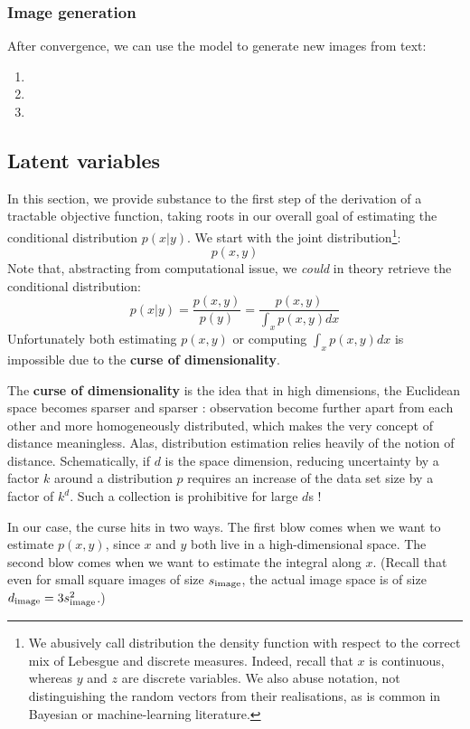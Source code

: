 \documentclass{article}
\begin{document}
\begin{appendix}
\subsubsection{Image generation}

After convergence, we can use the model to generate new images from text:

\begin{enumerate}
    \item
    \item
    \item
\end{enumerate}

\subsection{Latent variables}

In this section, we provide substance to the first step of the derivation of a tractable objective function, taking roots in our overall goal of estimating the conditional distribution $p(x|y)$. We start with the joint distribution\footnote{We abusively call distribution the density function with respect to the correct mix of Lebesgue and discrete measures. Indeed, recall that $x$ is continuous, whereas $y$ and $z$ are discrete variables. We also abuse notation, not distinguishing the random vectors from their realisations, as is common in Bayesian or machine-learning literature.}: $$p(x,y)$$
Note that, abstracting from computational issue, we \textit{could} in theory retrieve the conditional distribution: $$p(x|y)=\frac{p(x,y)}{p(y)}=\frac{p(x,y)}{\int_x p(x,y)dx} $$
Unfortunately both estimating $p(x,y)$ or computing $\int_x p(x,y)dx$ is impossible due to the \textbf{curse of dimensionality}.

The \textbf{curse of dimensionality} is the idea that in high dimensions, the Euclidean space becomes sparser and sparser : observation become further apart from each other and more homogeneously distributed, which makes the very concept of distance meaningless. Alas, distribution estimation relies heavily of the notion of distance. Schematically, if $d$ is the space dimension, reducing uncertainty by a factor $k$ around a distribution $p$ requires an increase of the data set size by a factor of $k^d$. Such a collection is prohibitive for large $d$s !

In our case, the curse hits in two ways. The first blow comes when we want to estimate $p(x,y)$, since $x$ and $y$ both live in a high-dimensional space. The second blow comes when we want to estimate the integral along $x$. (Recall that even for small square images of size $s_{\mathrm{image}}$, the actual image space is of size $d_{\mathrm{image}}=3s_{\mathrm{image}}^2$.)


\end{appendix}
\end{document}
